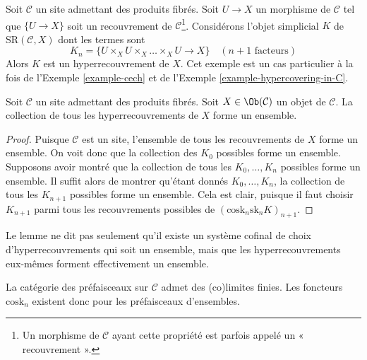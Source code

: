 \begin{example}
\label{example-cech-cover}
Soit $\mathcal{C}$ un site admettant des produits fibrés. Soit $U \to X$ un
morphisme de $\mathcal{C}$ tel que $\{U \to X\}$ soit un recouvrement de
$\mathcal{C}$\footnote{Un morphisme de $\mathcal{C}$ ayant cette propriété
est parfois appelé un « recouvrement ».}. Considérons l'objet simplicial $K$ de
$\text{SR}(\mathcal{C}, X)$ dont les termes sont
$$
K_n = \{U \times_X U \times_X \ldots \times_X U \to X\}
\quad (n + 1 \text{ facteurs})
$$
Alors $K$ est un hyperrecouvrement de $X$. Cet exemple est un cas particulier à la fois de
l'Exemple \ref{example-cech} et de
l'Exemple \ref{example-hypercovering-in-C}.
\end{example}

\begin{lemma}
\label{lemma-hypercoverings-set}
Soit $\mathcal{C}$ un site admettant des produits fibrés.
Soit $X \in \Ob(\mathcal{C})$ un objet de $\mathcal{C}$.
La collection de tous les hyperrecouvrements de $X$ forme un ensemble.
\end{lemma}

\begin{proof}
Puisque $\mathcal{C}$ est un site, l'ensemble de tous les recouvrements de
$X$ forme un ensemble. On voit donc que la collection
des $K_0$ possibles forme un ensemble. Supposons avoir montré que
la collection de tous les $K_0, \ldots, K_n$ possibles forme
un ensemble. Il suffit alors de montrer qu'étant donnés
$K_0, \ldots, K_n$, la collection de tous les
$K_{n + 1}$ possibles forme un ensemble. Cela est clair, puisque
il faut choisir $K_{n + 1}$ parmi tous les recouvrements possibles
de $(\text{cosk}_n \text{sk}_n K)_{n + 1}$.
\end{proof}

\begin{remark}
\label{remark-hypercoverings-really-set}
Le lemme ne dit pas seulement qu'il existe un système cofinal
de choix d'hyperrecouvrements qui soit un ensemble,
mais que les hyperrecouvrements eux-mêmes forment effectivement un ensemble.
\end{remark}

\noindent
La catégorie des préfaisceaux sur $\mathcal{C}$ admet des
(co)limites finies. Les foncteurs $\text{cosk}_n$
existent donc pour les préfaisceaux d'ensembles.

